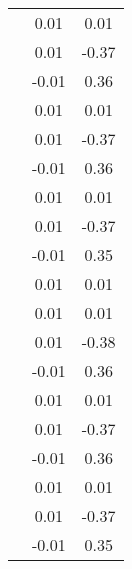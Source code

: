 \begin{table}
\begin{tabular}{c|cc|}
\multicolumn{1}{|c|}{} & \multicolumn{1}{|c|}{      0.01} & \multicolumn{1}{|c|}{      0.01} \\ 
\multicolumn{1}{|c|}{} & \multicolumn{1}{|c|}{      0.01} & \multicolumn{1}{|c|}{     -0.37} \\ 
\multicolumn{1}{|c|}{} & \multicolumn{1}{|c|}{     -0.01} & \multicolumn{1}{|c|}{      0.36} \\ 
\multicolumn{1}{|c|}{} & \multicolumn{1}{|c|}{      0.01} & \multicolumn{1}{|c|}{      0.01} \\ 
\multicolumn{1}{|c|}{} & \multicolumn{1}{|c|}{      0.01} & \multicolumn{1}{|c|}{     -0.37} \\ 
\multicolumn{1}{|c|}{} & \multicolumn{1}{|c|}{     -0.01} & \multicolumn{1}{|c|}{      0.36} \\ 
\multicolumn{1}{|c|}{} & \multicolumn{1}{|c|}{      0.01} & \multicolumn{1}{|c|}{      0.01} \\ 
\multicolumn{1}{|c|}{} & \multicolumn{1}{|c|}{      0.01} & \multicolumn{1}{|c|}{     -0.37} \\ 
\multicolumn{1}{|c|}{} & \multicolumn{1}{|c|}{     -0.01} & \multicolumn{1}{|c|}{      0.35} \\ 
\multicolumn{1}{|c|}{} & \multicolumn{1}{|c|}{      0.01} & \multicolumn{1}{|c|}{      0.01} \\ 
\multicolumn{1}{|c|}{} & \multicolumn{1}{|c|}{      0.01} & \multicolumn{1}{|c|}{      0.01} \\ 
\multicolumn{1}{|c|}{} & \multicolumn{1}{|c|}{      0.01} & \multicolumn{1}{|c|}{     -0.38} \\ 
\multicolumn{1}{|c|}{} & \multicolumn{1}{|c|}{     -0.01} & \multicolumn{1}{|c|}{      0.36} \\ 
\multicolumn{1}{|c|}{} & \multicolumn{1}{|c|}{      0.01} & \multicolumn{1}{|c|}{      0.01} \\ 
\multicolumn{1}{|c|}{} & \multicolumn{1}{|c|}{      0.01} & \multicolumn{1}{|c|}{     -0.37} \\ 
\multicolumn{1}{|c|}{} & \multicolumn{1}{|c|}{     -0.01} & \multicolumn{1}{|c|}{      0.36} \\ 
\multicolumn{1}{|c|}{} & \multicolumn{1}{|c|}{      0.01} & \multicolumn{1}{|c|}{      0.01} \\ 
\multicolumn{1}{|c|}{} & \multicolumn{1}{|c|}{      0.01} & \multicolumn{1}{|c|}{     -0.37} \\ 
\multicolumn{1}{|c|}{} & \multicolumn{1}{|c|}{     -0.01} & \multicolumn{1}{|c|}{      0.35} \\ 

\end{tabular}
\end{table}
